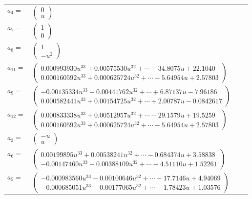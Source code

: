 \documentclass[1p]{elsarticle_modified}
\theoremstyle{definition}
\begin{document}
\begin{tabular}{m{7pt} m{180pt} m{7pt} m{180pt} }
\flushright $a_{4}=$&$\begin{pmatrix}0\\u\end{pmatrix}$ \\
\flushright $a_{7}=$&$\begin{pmatrix}1\\0\end{pmatrix}$ \\
\flushright $a_{8}=$&$\begin{pmatrix}1\\- u^2\end{pmatrix}$ \\
\flushright $a_{11}=$&$\begin{pmatrix}0.000993930 u^{33}+0.00575530 u^{32}+\cdots-34.8075 u+22.1040\\0.000160592 u^{33}+0.000625724 u^{32}+\cdots-5.64954 u+2.57803\end{pmatrix}$ \\
\flushright $a_{9}=$&$\begin{pmatrix}-0.00135334 u^{33}-0.00441762 u^{32}+\cdots+6.87137 u-7.96186\\0.000582441 u^{33}+0.00154725 u^{32}+\cdots+2.00787 u-0.0842617\end{pmatrix}$ \\
\flushright $a_{12}=$&$\begin{pmatrix}0.000833338 u^{33}+0.00512957 u^{32}+\cdots-29.1579 u+19.5259\\0.000160592 u^{33}+0.000625724 u^{32}+\cdots-5.64954 u+2.57803\end{pmatrix}$ \\
\flushright $a_{3}=$&$\begin{pmatrix}- u\\u\end{pmatrix}$ \\
\flushright $a_{6}=$&$\begin{pmatrix}0.00199895 u^{33}+0.00538241 u^{32}+\cdots-0.684374 u+3.58838\\-0.00147460 u^{33}-0.00388109 u^{32}+\cdots-4.51110 u+1.52261\end{pmatrix}$ \\
\flushright $a_{5}=$&$\begin{pmatrix}-0.000983560 u^{33}-0.00100646 u^{32}+\cdots-17.7146 u+4.94069\\-0.000685051 u^{33}-0.00177065 u^{32}+\cdots-1.78423 u+1.03576\end{pmatrix}$ \\

\end{tabular}
\end{document}
